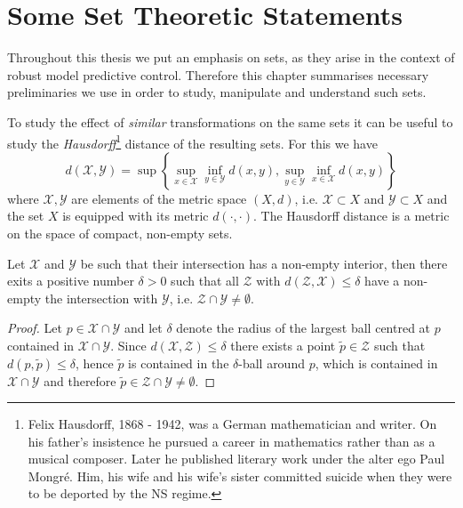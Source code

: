 
\chapter{Some Set Theoretic Statements}\label{chap:set:theo:statements}

Throughout this thesis we put an emphasis on sets, as they arise in the context of robust model predictive control.
%
Therefore this chapter summarises necessary preliminaries we use in order to study, manipulate and understand such sets.
%




To study the effect of \emph{similar} transformations on the same sets it can be useful to study the \emph{Hausdorff}\footnote{Felix Hausdorff, 1868 - 1942, was a German mathematician and writer. On his father's insistence he pursued a career in mathematics rather than as a musical composer. Later he published literary work under the alter ego Paul Mongr\' e. Him, his wife and his wife's sister committed suicide when they were to be deported by the NS regime.} distance of the resulting sets. For this we have 
%
\begin{equation}
	d(\mathcal X,\mathcal Y) = \sup\left\{\sup_{x\in\mathcal X}\inf_{y\in\mathcal Y} d(x,y), \sup_{y\in\mathcal Y}\inf_{x\in\mathcal X} d(x,y) \right\}
\end{equation}
%
where $\mathcal X,\mathcal Y$ are elements of the metric space $(X,d)$, i.e. $\mathcal X\subset X$ and $\mathcal Y\subset X$ and the set $X$ is equipped with its metric $d(\cdot,\cdot)$.
%
The Hausdorff distance is a metric on the space of compact, non-empty sets.
%
\begin{thm}\label{thm:non:empty:intersection}
Let $\mathcal X$ and $\mathcal Y$ be such that their intersection has a non-empty interior, then there exits a positive number $\delta>0$ such that all $\mathcal Z$ with $d(\mathcal Z,\mathcal X)\leq\delta$ have a non-empty the intersection with $\mathcal Y$, i.e. $\mathcal Z\cap\mathcal Y\neq\emptyset$.
\end{thm}
%
\begin{proof}
Let $p\in\mathcal X\cap\mathcal Y$ and let $\delta$ denote the radius of the largest ball centred at $p$ contained in $\mathcal X\cap\mathcal Y$.
%
Since $d(\mathcal X,\mathcal Z)\leq\delta$ there exists a point $\tilde p\in\mathcal Z$ such that $d(p,\tilde p)\leq \delta$, hence $\tilde p$ is contained in the $\delta$-ball around $p$, which is contained in $\mathcal X\cap\mathcal Y$ and therefore $\tilde p\in\mathcal Z\cap\mathcal Y\neq\emptyset$.
\end{proof}

